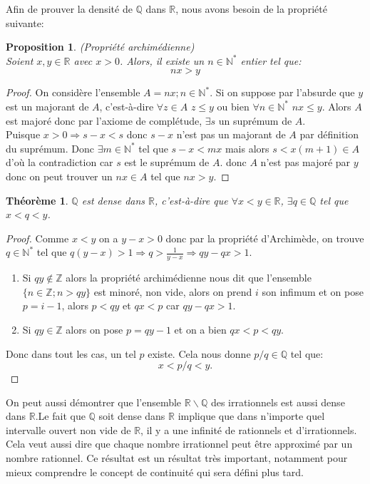 \documentclass[oneside,12pt,french,table]{book}
\theoremstyle{definition}
\theoremstyle{plain}
\newtheorem{theorem}[definition]{Théorème}
\newtheorem{proposition}[definition]{Proposition}
\theoremstyle{remark}
\newcommand{\Nn}{{\mathbb{N}}}
\newcommand{\Zz}{{\mathbb{Z}}}
\newcommand{\Rr}{{\mathbb{R}}}
\newcommand{\Qq}{{\mathbb{Q}}}
\begin{document}
\begin{tcolorbox}
    

Afin de prouver la densité de $\Qq$ dans $\Rr$, nous avons besoin de la propriété suivante: 
\begin{proposition}
    (\textit{Propriété archimédienne})\\
    Soient $x,y\in \Rr$ avec $x>0$. Alors, il existe un $n\in \Nn^*$ entier tel que:
    $$nx>y$$
\end{proposition}
\begin{proof}
    On considère l'ensemble $A={nx;n\in \Nn^*}$. Si on suppose par l'absurde que $y$ est un majorant de $A$, c'est-à-dire $\forall z\in A$ $z\leq y $ ou bien $\forall n\in \Nn^*$ $nx\leq y $. Alors $A$ est majoré donc par l'axiome de complétude, $\exists s$ un suprémum de $A$. \\
    Puisque $x>0\Rightarrow s-x<s$ donc $s-x$ n'est pas un majorant de $A$ par définition du suprémum. Donc $\exists m \in \Nn^*$ tel que $s-x<mx$ mais alors $s<x(m+1)\in A$ d'où la contradiction car $s$ est le suprémum de $A$. donc $A$ n'est pas majoré par $y$ donc on peut trouver un $nx\in A$ tel que $nx>y$. 
\end{proof}


    

\begin{theorem}
   $\Qq$ est dense dans $\Rr$, c'est-à-dire que $\forall x<y \in \Rr$, $\exists q\in \Qq$ tel que $x<q<y$.  
\end{theorem}


\begin{proof}
    Comme $x<y$ on a $y-x>0$ donc par la propriété d'Archimède, on trouve $q\in \Nn^*$ tel que $q(y-x)>1 \Rightarrow q>\frac{1}{y-x}\Rightarrow qy-qx>1$. 
    \begin{enumerate}
        \item Si $qy\notin \Zz$ alors la propriété archimédienne nous dit que l'ensemble $\{n\in \Zz; n>qy\}$ est minoré, non vide, alors on prend $i$ son infimum et on pose $p=i-1$, alors $p<qy$ et $qx<p$ car $qy-qx>1$. 
        \item Si $qy\in \Zz$ alors on pose $p=qy-1$ et on a bien $qx<p<qy$. 
    \end{enumerate}
    Donc dans tout les cas, un tel $p$ existe. Cela nous donne $p/q \in \Qq$ tel que: 
    $$x<p/q<y.$$
\end{proof}


\end{tcolorbox}
 On peut aussi démontrer que l'ensemble $\Rr \backslash \Qq$ des irrationnels est aussi dense dans $\Rr$.Le fait que $\Qq$ soit dense dans $\Rr$ implique que dans n'importe quel intervalle ouvert non vide de $\Rr$, il y a une infinité de rationnels et d'irrationnels. Cela veut aussi dire que chaque nombre irrationnel peut être approximé par un nombre rationnel. Ce résultat est un résultat très important, notamment pour mieux comprendre le concept de continuité qui sera défini plus tard. 
\end{document}
